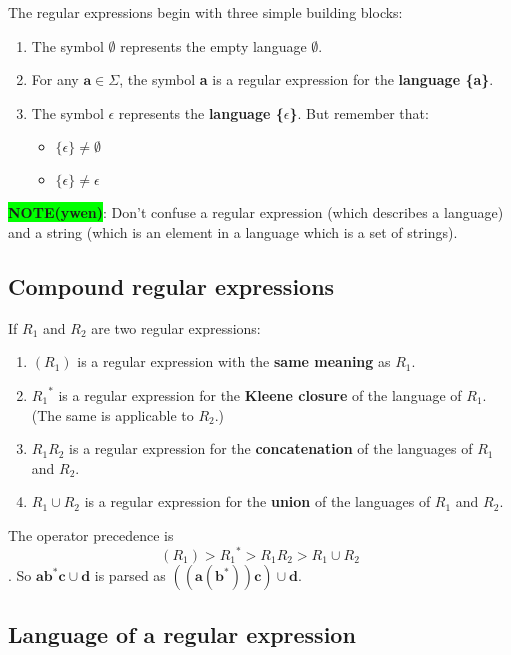 \documentclass[12pt, letterpaper, oneside]{book}
\begin{document}
The regular expressions begin with three simple building blocks:
\begin{enumerate}
  \item The symbol $\emptyset$ represents the empty language $\emptyset$.
  \item For any $\mathbf{a} \in \Sigma$, the symbol \textbf{a} is a regular expression for the \textbf{language \{a\}}.
  \item The symbol $\epsilon$ represents the \textbf{language \{$\epsilon$\}}. But remember that:
        \begin{itemize}
          \item $\{\epsilon\} \ne \emptyset$
          \item $\{\epsilon\} \ne \epsilon$
        \end{itemize}
\end{enumerate}

\colorbox{lime}{\textbf{NOTE(ywen)}}: Don't confuse a regular expression (which describes a language) and a string
(which is an element in a language which is a set of strings).

\subsection{Compound regular expressions}

If $R_1$ and $R_2$ are two regular expressions:
\begin{enumerate}
  \item $(R_1)$ is a regular expression with the \textbf{same meaning} as $R_1$.
  \item ${R_1}^*$ is a regular expression for the \textbf{Kleene closure} of the language of $R_1$. (The same is
        applicable to $R_2$.)
  \item $R_1R_2$ is a regular expression for the \textbf{concatenation} of the languages of $R_1$ and $R_2$.
  \item $R_1 \cup R_2$ is a regular expression for the \textbf{union} of the languages of $R_1$ and $R_2$.
\end{enumerate}

The operator precedence is \[ (R_1) > {R_1}^* > R_1R_2 > R_1 \cup R_2 \]. So $\mathbf{ab^*c \cup d}$ is parsed as
$\mathbf{((a(b^*))c) \cup d}$.

\subsection{Language of a regular expression}
\end{document}

